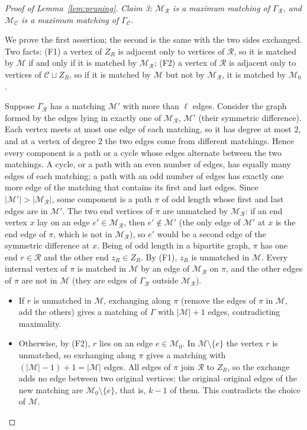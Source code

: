 \documentclass[11pt]{article}
\theoremstyle{remark}
\newcommand{\abs}[1]{\lvert #1\rvert}
\newcommand{\cR}{\mathcal R}
\newcommand{\cC}{\mathcal C}
\newcommand{\cM}{\mathcal M}
\begin{document}
\begin{proof}[Proof of Lemma~\ref{lem:pruning}]
\emph{Claim 3: $\cM_{\cR}$ is a maximum matching of $\Gamma_{\cR}$, and
$\cM_{\cC}$ is a maximum matching of $\Gamma_{\cC}$.}

We prove the first assertion; the second is the same with the two sides
exchanged. Two facts: (F1) a vertex of $Z_R$ is adjacent only to vertices
of $\cR$, so it is matched by $\cM$ if and only if it is matched by
$\cM_{\cR}$; (F2) a vertex of $\cR$ is adjacent only to vertices of
$\cC\sqcup Z_R$, so if it is matched by $\cM$ but not by $\cM_{\cR}$, it is
matched by $\cM_0$.

Suppose $\Gamma_{\cR}$ has a matching $\cM'$ with more than $\ell$ edges.
Consider the graph formed by the edges lying in exactly one of $\cM_{\cR}$,
$\cM'$ (their symmetric difference). Each vertex meets at most one edge of
each matching, so it has degree at most $2$, and at a vertex of degree $2$
the two edges come from different matchings. Hence every component is a path
or a cycle whose edges alternate between the two matchings. A cycle, or a
path with an even number of edges, has equally many edges of each matching; a
path with an odd number of edges has exactly one more edge of the matching
that contains its first and last edges. Since $\abs{\cM'}>\abs{\cM_{\cR}}$,
some component is a path $\pi$ of odd length whose first and last edges are
in $\cM'$. The two end vertices of $\pi$ are unmatched by $\cM_{\cR}$: if an
end vertex $x$ lay on an edge $e'\in\cM_{\cR}$, then $e'\notin\cM'$ (the only
edge of $\cM'$ at $x$ is the end edge of $\pi$, which is not in $\cM_{\cR}$),
so $e'$ would be a second edge of the symmetric difference at $x$. Being of
odd length in a bipartite graph, $\pi$ has one end
$r\in\cR$ and the other end $z_R\in Z_R$. By (F1), $z_R$ is unmatched in
$\cM$. Every internal vertex of $\pi$ is matched in $\cM$ by an edge of
$\cM_{\cR}$ on $\pi$, and the other edges of $\pi$ are not in $\cM$ (they
are edges of $\Gamma_{\cR}$ outside $\cM_{\cR}$).
\begin{itemize}[leftmargin=2em]
\item If $r$ is unmatched in $\cM$, exchanging along $\pi$ (remove the edges
of $\pi$ in $\cM$, add the others) gives a matching of $\Gamma$ with
$\abs\cM+1$ edges, contradicting maximality.
\item Otherwise, by (F2), $r$ lies on an edge $e\in\cM_0$. In
$\cM\setminus\{e\}$ the vertex $r$ is unmatched, so exchanging along $\pi$
gives a matching with $(\abs\cM-1)+1=\abs\cM$ edges. All edges of $\pi$ join
$\cR$ to $Z_R$, so the exchange adds no edge between two original vertices:
the original--original edges of the new matching are $\cM_0\setminus\{e\}$,
that is, $k-1$ of them. This contradicts the choice of $\cM$.
\end{itemize}


\end{proof}
\end{document}
